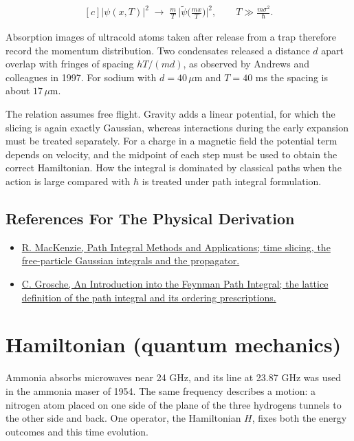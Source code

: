 \documentclass[11pt,oneside]{book}
\newenvironment{centeredalign}{\[\begin{gathered}[c]}{\end{gathered}\]}
\begin{document}
\begin{centeredalign}
|\psi(x,T)|^2\;\to\;\frac mT\,\Big|\widetilde\psi\Big(\frac{mx}{T}\Big)\Big|^2,
\qquad T\gg\frac{m\sigma^2}{\hbar}.
\end{centeredalign}

Absorption images of ultracold atoms taken after release from a trap therefore record the momentum distribution. Two condensates released a distance \(d\) apart overlap with fringes of spacing \(hT/(md)\), as observed by Andrews and colleagues in 1997. For sodium with \(d=40\,\mu\mathrm m\) and \(T=40\) ms the spacing is about \(17\,\mu\mathrm m\).

The relation assumes free flight. Gravity adds a linear potential, for which the slicing is again exactly Gaussian, whereas interactions during the early expansion must be treated separately. For a charge in a magnetic field the potential term depends on velocity, and the midpoint of each step must be used to obtain the correct Hamiltonian. How the integral is dominated by classical paths when the action is large compared with \(\hbar\) is treated under path integral formulation.

\subsection*{References For The Physical Derivation}
\begin{itemize}
\item \href{https://arxiv.org/abs/quant-ph/0004090}{R. MacKenzie, Path Integral Methods and Applications; time slicing, the free-particle Gaussian integrals and the propagator.}
\item \href{https://arxiv.org/abs/hep-th/9302097}{C. Grosche, An Introduction into the Feynman Path Integral; the lattice definition of the path integral and its ordering prescriptions.}
\end{itemize}





\clearpage

\section{Hamiltonian (quantum mechanics)}

\label{topic:hamiltonian-quantum-mechanics}

Ammonia absorbs microwaves near 24 GHz, and its line at 23.87 GHz was used in the ammonia maser of 1954. The same frequency describes a motion: a nitrogen atom placed on one side of the plane of the three hydrogens tunnels to the other side and back. One operator, the Hamiltonian \(H\), fixes both the energy outcomes and this time evolution.
\end{document}
